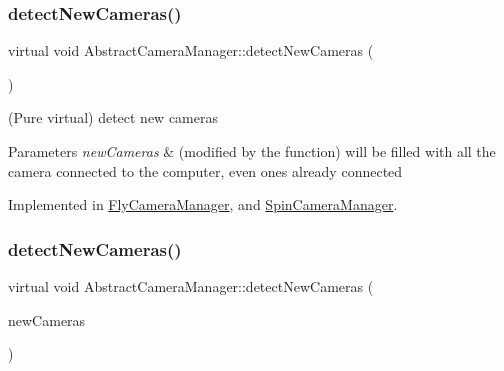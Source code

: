 \mbox{\label{class_abstract_camera_manager_a5285c2cf6e1976d0c22e46f01efdef51}} 
\subsubsection{\texorpdfstring{detectNewCameras()}{detectNewCameras()}\hspace{0.1cm}{\footnotesize\ttfamily [1/2]}}
{\footnotesize\ttfamily virtual void Abstract\+Camera\+Manager\+::detect\+New\+Cameras (\begin{DoxyParamCaption}{ }\end{DoxyParamCaption})\hspace{0.3cm}{\ttfamily [pure virtual]}}



(Pure virtual) detect new cameras 


\begin{DoxyParams}{Parameters}
{\em new\+Cameras} & (modified by the function) will be filled with all the camera connected to the computer, even ones already connected \\
\hline
\end{DoxyParams}


Implemented in \mbox{\hyperlink{class_fly_camera_manager_a0f2138fb094303db2da4b8dee7f1fba8}{Fly\+Camera\+Manager}}, and \mbox{\hyperlink{class_spin_camera_manager_affc9edfd215e7dd1ad050cd111906863}{Spin\+Camera\+Manager}}.

\mbox{\label{class_abstract_camera_manager_a8e215b2531fd8c18551382dc8f571817}} 
\subsubsection{\texorpdfstring{detectNewCameras()}{detectNewCameras()}\hspace{0.1cm}{\footnotesize\ttfamily [2/2]}}
{\footnotesize\ttfamily virtual void Abstract\+Camera\+Manager\+::detect\+New\+Cameras (\begin{DoxyParamCaption}\item[{std\+::vector$<$ \mbox{\hyperlink{class_abstract_camera}{Abstract\+Camera}} $\ast$ $>$ $\ast$}]{new\+Cameras }\end{DoxyParamCaption})\hspace{0.3cm}{\ttfamily [pure virtual]}}



